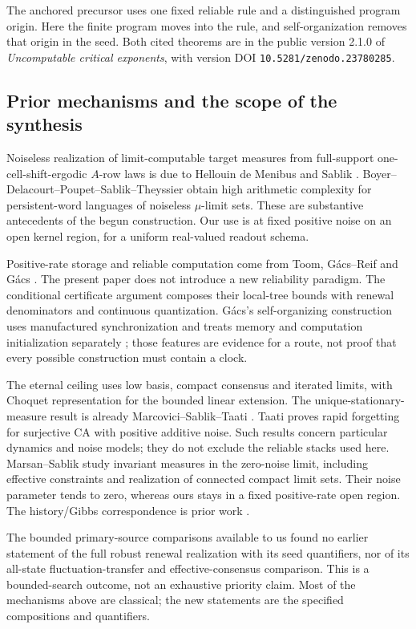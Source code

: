 The anchored precursor \cite[Theorem~1.5]{criticalcurrent} uses
one fixed reliable rule and a distinguished program origin.
Here the finite program moves into the rule, and self-organization
removes that origin in the seed. Both cited theorems are in the
public version 2.1.0 of \emph{Uncomputable critical exponents},
with version DOI \texttt{10.5281/zenodo.23780285}.

\subsection{Prior mechanisms and the scope of the synthesis}
Noiseless realization of limit-computable target measures from
full-support one-cell-shift-ergodic $A$-row laws is due to Hellouin de Menibus
and Sablik \cite{hdms}. Boyer--Delacourt--Poupet--Sablik--Theyssier
\cite{boyer} obtain high arithmetic complexity for persistent-word
languages of noiseless $\mu$-limit sets. These are substantive
antecedents of the begun construction. Our use is at fixed
positive noise on an open kernel region, for a uniform real-valued
readout schema.

Positive-rate storage and reliable computation come from Toom,
G\'acs--Reif and G\'acs \cite{toom,gacsreif,gacstoom,gacsself}.
The present paper does not introduce a new reliability paradigm.
The conditional certificate argument composes their local-tree
bounds with renewal denominators and continuous quantization.
G\'acs's self-organizing construction uses manufactured
synchronization and treats memory and computation initialization
separately \cite{gacsself}; those features are evidence for a route,
not proof that every possible construction must contain a clock.

The eternal ceiling uses low basis, compact consensus and
iterated limits, with Choquet representation for the bounded
linear extension. The unique-stationary-measure result is already
Marcovici--Sablik--Taati \cite{marcovici}. Taati \cite{taatinoise}
proves rapid forgetting for surjective CA with positive additive
noise. Such results concern particular dynamics and noise models;
they do not exclude the reliable stacks used here.
Marsan--Sablik \cite{marsan} study invariant measures in the
zero-noise limit, including effective constraints and realization
of connected compact limit sets. Their noise parameter tends to
zero, whereas ours stays in a fixed positive-rate open region.
The history/Gibbs correspondence is prior work
\cite{domany,goldstein,miekisztaati}.

The bounded primary-source comparisons available to us found no
earlier statement of the full robust renewal realization with its
seed quantifiers, nor of its all-state fluctuation-transfer and
effective-consensus comparison. This is a bounded-search outcome,
not an exhaustive priority claim. Most of the mechanisms above
are classical; the new statements are the specified compositions
and quantifiers.

